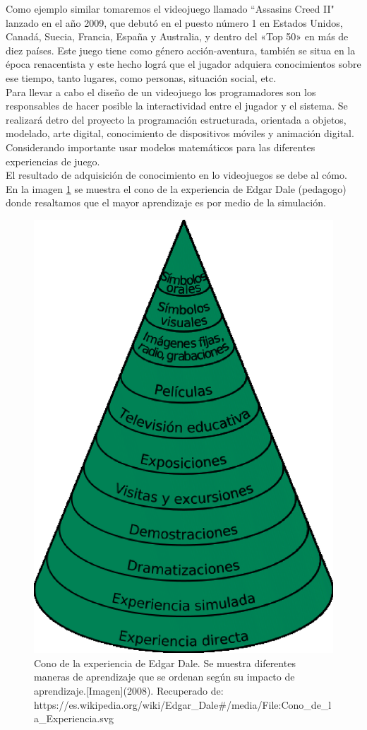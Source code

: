 Como ejemplo similar tomaremos el videojuego llamado ``Assasins Creed II" lanzado en el año 2009, que debutó en el puesto número 1 en Estados Unidos, Canadá, Suecia, Francia, España y Australia, y dentro del «Top 50» en más de diez países. Este juego tiene como género acción-aventura, también se situa en la época renacentista y este hecho lográ que el jugador adquiera conocimientos sobre ese tiempo, tanto lugares, como personas, situación social, etc.
\\[1pt]

Para llevar a cabo el diseño de un videojuego los programadores son los responsables de hacer posible la interactividad entre el jugador y el sistema. Se realizará detro del proyecto la programación estructurada, orientada a objetos, modelado, arte digital, conocimiento de dispositivos móviles y animación digital. Considerando importante usar modelos matemáticos para las diferentes experiencias de juego. 
\\[1pt]

El resultado de adquisición de conocimiento en lo videojuegos se debe al cómo. En la imagen \ref{fig:conoAprendizaje} se muestra el cono de la experiencia de Edgar Dale (pedagogo) donde resaltamos que el mayor aprendizaje es por medio de la simulación.

\begin{figure}
	\centering 
	\includegraphics[width=.5\textwidth]{03MarcoTeorico/imageR/conoAprendizaje}
	\caption{Cono de la experiencia de Edgar Dale. Se muestra diferentes maneras de aprendizaje que se ordenan según su impacto de aprendizaje.[Imagen](2008). Recuperado de: https://es.wikipedia.org/wiki/Edgar\_Dale\#/media/File:Cono\_de\_la\_Experiencia.svg}
	\label{fig:conoAprendizaje}
\end{figure}

